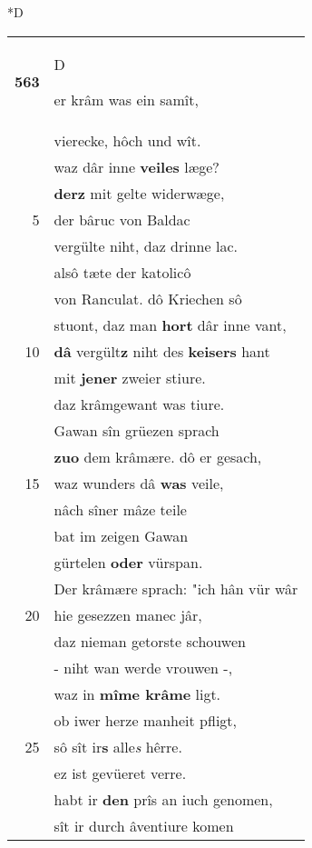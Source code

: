 \documentclass[8pt,a4paper,notitlepage]{article}
\begin{document}
\begin{table}[ht]
\begin{minipage}[t]{0.5\linewidth}
\small
\begin{center}*D
\end{center}
\begin{tabular}{rl}
\textbf{563} & \begin{large}D\end{large}er krâm was ein samît,\\ 
 & vierecke, hôch und wît.\\ 
 & waz dâr inne \textbf{veiles} læge?\\ 
 & \textbf{derz} mit gelte widerwæge,\\ 
5 & der bâruc von Baldac\\ 
 & vergülte niht, daz drinne lac.\\ 
 & alsô tæte der katolicô\\ 
 & von Ranculat. dô Kriechen sô\\ 
 & stuont, daz man \textbf{hort} dâr inne vant,\\ 
10 & \textbf{dâ} vergült\textbf{z} niht des \textbf{keisers} hant\\ 
 & mit \textbf{jener} zweier stiure.\\ 
 & daz krâmgewant was tiure.\\ 
 & Gawan sîn grüezen sprach\\ 
 & \textbf{zuo} dem krâmære. dô er gesach,\\ 
15 & waz wunders dâ \textbf{was} veile,\\ 
 & nâch sîner mâze teile\\ 
 & bat im zeigen Gawan\\ 
 & gürtelen \textbf{oder} vürspan.\\ 
 & Der krâmære sprach: "ich hân vür wâr\\ 
20 & hie gesezzen manec jâr,\\ 
 & daz nieman getorste schouwen\\ 
 & - niht wan werde vrouwen -,\\ 
 & waz in \textbf{mîme krâme} ligt.\\ 
 & ob iwer herze manheit pfligt,\\ 
25 & sô sît ir\textbf{s} alle\textit{s} hêrre.\\ 
 & ez ist gevüeret verre.\\ 
 & habt ir \textbf{den} prîs an iuch genomen,\\ 
 & sît ir durch âventiure komen\\ 

\end{tabular}
\end{minipage}
\end{table}
\end{document}
